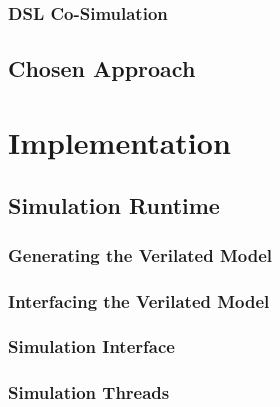 \documentclass[12pt]{report}
\begin{document}
\subsection{DSL Co-Simulation} %

\section{Chosen Approach} %

\chapter{Implementation} %

\section{Simulation Runtime} %

\subsection{Generating the Verilated Model} %

\subsection{Interfacing the Verilated Model} %

\subsection{Simulation Interface} %

\subsection{Simulation Threads} %
\end{document}
